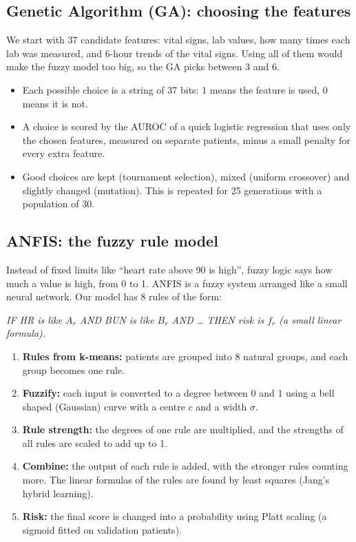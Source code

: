 \documentclass[11pt,a4paper]{article}
\begin{document}
\subsection{Genetic Algorithm (GA): choosing the features}
We start with 37 candidate features: vital signs, lab values, how many times each lab was measured, and 6-hour trends of the vital signs. Using all of them would make the fuzzy model too big, so the GA picks between 3 and 6.
\begin{itemize}[nosep]
\item Each possible choice is a string of 37 bits: 1 means the feature is used, 0 means it is not.
\item A choice is scored by the AUROC of a quick logistic regression that uses only the chosen features, measured on separate patients, minus a small penalty for every extra feature.
\item Good choices are kept (tournament selection), mixed (uniform crossover) and slightly changed (mutation). This is repeated for 25 generations with a population of 30.
\end{itemize}

\subsection{ANFIS: the fuzzy rule model}
Instead of fixed limits like ``heart rate above 90 is high'', fuzzy logic says how much a value is high, from 0 to 1. ANFIS is a fuzzy system arranged like a small neural network. Our model has 8 rules of the form:

\emph{IF HR is like $A_r$ AND BUN is like $B_r$ AND \dots{} THEN risk is $f_r$ (a small linear formula).}

\begin{enumerate}[nosep]
\item \textbf{Rules from k-means:} patients are grouped into 8 natural groups, and each group becomes one rule.
\item \textbf{Fuzzify:} each input is converted to a degree between 0 and 1 using a bell shaped (Gaussian) curve with a centre $c$ and a width $\sigma$.
\item \textbf{Rule strength:} the degrees of one rule are multiplied, and the strengths of all rules are scaled to add up to 1.
\item \textbf{Combine:} the output of each rule is added, with the stronger rules counting more. The linear formulas of the rules are found by least squares (Jang's hybrid learning).
\item \textbf{Risk:} the final score is changed into a probability using Platt scaling (a sigmoid fitted on validation patients).
\end{enumerate}
\end{document}
